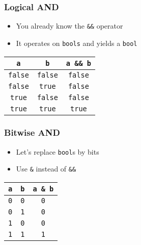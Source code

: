\begin{frame}
  \frametitle{Logical AND}
  \begin{itemize}
    \item You already know the \texttt{\&\&} operator
    \item It operates on \texttt{bools} and yields a \texttt{bool}
  \end{itemize}
  \begin{center}
    \begin{tabular}{ccc}
      \toprule
      \texttt{a} & \texttt{b} & \texttt{a \&\& b} \\
      \midrule
      \texttt{false} & \texttt{false} & \texttt{false} \\
      \texttt{false} & \texttt{true} & \texttt{false} \\
      \texttt{true} & \texttt{false} & \texttt{false} \\
      \texttt{true} & \texttt{true} & \texttt{true} \\
      \bottomrule
    \end{tabular}
  \end{center}
\end{frame}

\begin{frame}
  \frametitle{Bitwise AND}
  \begin{itemize}
    \item Let's replace \texttt{bool}s by bits
    \item Use \texttt{\&} instead of \texttt{\&\&}
  \end{itemize}
  \begin{center}
    \begin{tabular}{ccc}
      \toprule
      \texttt{a} & \texttt{b} & \texttt{a \& b} \\
      \midrule
      \texttt{0} & \texttt{0} & \texttt{0} \\
      \texttt{0} & \texttt{1} & \texttt{0} \\
      \texttt{1} & \texttt{0} & \texttt{0} \\
      \texttt{1} & \texttt{1} & \texttt{1} \\
      \bottomrule
    \end{tabular}
  \end{center}
\end{frame}

